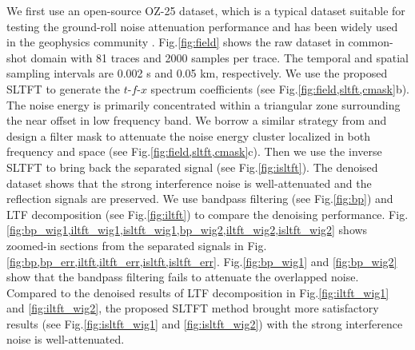 We first use an open-source OZ-25 dataset, which is a typical dataset
suitable for testing the ground-roll noise attenuation performance and
has been widely used in the geophysics
community \cite[]{yilmaz1987,yarham2006,chen2015,Tao20}. Fig.\ref{fig:field}
shows the raw dataset in common-shot domain with 81 traces and 2000
samples per trace. The temporal and spatial sampling intervals are
0.002 s and 0.05 km, respectively.  We use the proposed SLTFT to
generate the $t\text{-}f\text{-}x$ spectrum coefficients (see
Fig.\ref{fig:field,sltft,cmask}b). The noise energy is primarily concentrated
within a triangular zone surrounding the near offset in low frequency
band. We borrow a similar strategy from \cite{Liu13} and design a
filter mask to attenuate the noise energy cluster localized in both
frequency and space (see Fig.\ref{fig:field,sltft,cmask}c). Then we use the
inverse SLTFT to bring back the separated signal (see
Fig.\ref{fig:isltft}). The denoised dataset shows that the strong
interference noise is well-attenuated and the reflection signals are
preserved. We use bandpass filtering (see Fig.\ref{fig:bp}) and LTF
decomposition (see Fig.\ref{fig:iltft}) to compare the denoising
performance.
Fig.\ref{fig:bp_wig1,iltft_wig1,isltft_wig1,bp_wig2,iltft_wig2,isltft_wig2}
shows zoomed-in sections from the separated signals in
Fig.\ref{fig:bp,bp_err,iltft,iltft_err,isltft,isltft_err}.
Fig.\ref{fig:bp_wig1}
and \ref{fig:bp_wig2} show that the bandpass filtering fails to
attenuate the overlapped noise. Compared to the denoised results of
LTF decomposition in Fig.\ref{fig:iltft_wig1}
and \ref{fig:iltft_wig2}, the proposed SLTFT method brought more
satisfactory results (see Fig.\ref{fig:isltft_wig1}
and \ref{fig:isltft_wig2}) with the strong interference noise is
well-attenuated.

	


